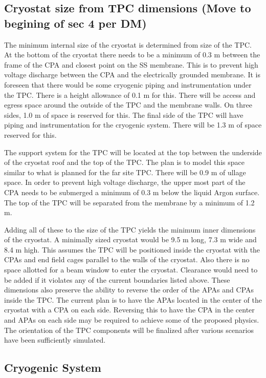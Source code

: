 \subsection{Cryostat size from TPC dimensions (Move to begining of sec 4 per DM) }

The minimum internal size of the cryostat is determined from size of the TPC.  At the bottom of the 
cryostat there needs to be a minimum of 0.3 m between the frame of the CPA and closest point on the SS 
membrane.  This is to prevent high voltage discharge between the CPA and the electrically grounded 
membrane. It is foreseen that there would be some cryogenic piping and instrumentation under the TPC.  
There is a height allowance of 0.1 m for this.  There will be access and egress space around the outside 
of the TPC and the membrane walls.  On three sides, 1.0 m of space is reserved for this.  The final side of 
the TPC will have piping and instrumentation for the cryogenic system.  There will be 1.3 m of space 
reserved for this.  

The support system for the TPC will be located at the top between the underside of the cryostat roof and 
the top of the TPC.  The plan is to model this space similar to what is planned for the far site TPC.  There 
will be 0.9 m of ullage space.  In order to prevent high voltage discharge, the upper most part of the CPA 
needs to be submerged a minimum of 0.3 m below the liquid Argon surface.  The top of the TPC will be 
separated from the membrane by a minimum of 1.2 m.  

Adding all of these to the size of the TPC yields the minimum inner dimensions of the cryostat.  A 
minimally sized cryostat would be 9.5 m long, 7.3 m wide and 8.4 m high.  This assumes the TPC will be 
positioned inside the cryostat with the CPAs and end field cages parallel to the walls of the cryostat.  Also 
there is no space allotted for a beam window to enter the cryostat.  Clearance would need to be added if 
it violates any of the current boundaries listed above.  
These dimensions also preserve the ability to reverse the order of the APAs and CPAs inside the TPC.  The 
current plan is to have the APAs located in the center of the cryostat with a CPA on each side.  Reversing 
this to have the CPA in the center and APAs on each side may be required to achieve some of the 
proposed physics.  The orientation of the TPC components will be finalized after various scenarios have 
been sufficiently simulated.  

\subsection{Cryogenic System}

